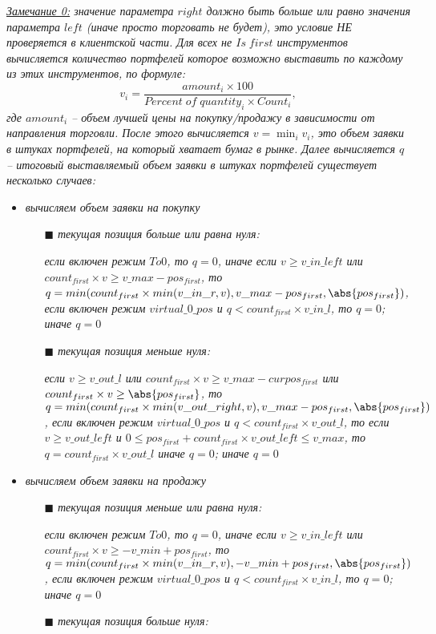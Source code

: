 \noindent\label{comment0}\textit{\underline{Замечание 0:} значение параметра $right$ должно быть больше или равно значения параметра $left$ (иначе просто
торговать не будет), это условие НЕ проверяется в клиентской части. Для всех не $Is \; first$ инструментов вычисляется количество портфелей которое
возможно выставить по каждому из этих инструментов, по формуле:
\[
	v_i = \frac{amount_i \times 100}{Percent \; of \; quantity_i \times Count_i},
\]
где $amount_i$ -- объем лучшей цены на покупку/продажу в зависимости от направления торговли. После этого вычисляется $\displaystyle v = \min_i v_i$, это
объем заявки в штуках портфелей, на который хватает бумаг в рынке. Далее вычисляется $q$ -- итоговый выставляемый объем заявки в штуках портфелей
существует несколько случаев:}
\begin{itemize}
	\item \textit{вычисляем объем заявки на покупку}
	\begin{itemize}
		\item[\scriptsize$\blacksquare$]\textit{текущая позиция больше или равна нуля:}
			
			\textit{если включен режим $To0$, то $q=0$, иначе если $v \geq v\_in\_left$ или $count_{first} \times v \geq v\_max - pos_{first}$, то
			$q=min(count_{first} \times min(v\_in\_r, v), v\_max - pos_{first}, \abs{pos_{first}})$, если включен режим $virtual\_0\_pos$ и $q < count_{first} \times v\_in\_l$,
			то $q=0$; иначе $q=0$}
		\item[\scriptsize$\blacksquare$]\textit{текущая позиция меньше нуля:}
			
			\textit{если $v \geq v\_out\_l$ или $count_{first} \times v \geq v\_max - curpos_{first}$ или $count_{first} \times v \geq \abs{pos_{first}}$, то
			$q=min(count_{first} \times min(v\_out\_right, v), v\_max - pos_{first}, \abs{pos_{first}})$, если включен режим $virtual\_0\_pos$ и
			$q < count_{first} \times v\_out\_l$, то если $v \geq v\_out\_left$ и $0 \leq pos_{first} + count_{first} \times v\_out\_left \leq v\_max$, то
			$q = count_{first} \times v\_out\_l$ иначе $q=0$; иначе $q=0$}
	\end{itemize}
	\item \textit{вычисляем объем заявки на продажу}
	\begin{itemize}
		\item[\scriptsize$\blacksquare$]\textit{текущая позиция меньше или равна нуля:}
		
			\textit{если включен режим $To0$, то $q=0$, иначе если $v \geq v\_in\_left$ или $count_{first} \times v \geq -v\_min + pos_{first}$, то
			$q=min(count_{first} \times min(v\_in\_r, v), -v\_min + pos_{first}, \abs{pos_{first}})$, если включен режим $virtual\_0\_pos$ и $q < count_{first} \times v\_in\_l$,
			то $q=0$; иначе $q=0$}
		\item[\scriptsize$\blacksquare$]\textit{текущая позиция больше нуля:}
			

\end{itemize}
\end{itemize}
